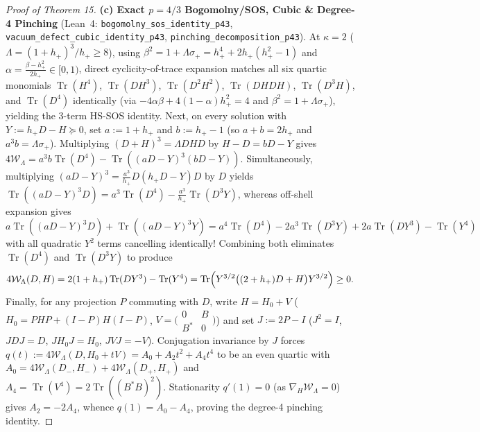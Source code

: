 \documentclass[10pt,letterpaper]{article}
\newcommand{\Tr}{\operatorname{Tr}}
\begin{document}
\begin{proof}[Proof of Theorem 15]
\textbf{(c) Exact $p = 4/3$ Bogomolny/SOS, Cubic \& Degree-4 Pinching} (Lean~4: \texttt{bogomolny\_sos\_identity\_p43}, \texttt{vacuum\_defect\_\allowbreak cubic\_identity\_p43}, \texttt{pinching\_\allowbreak decomposition\_p43}).
At $\kappa = 2$ ($\Lambda = (1+h_+)^3/h_+ \ge 8$), using $\beta^2 = 1 + \Lambda\sigma_+ = h_+^4 + 2h_+(h_+^2 - 1)$ and $\alpha = \frac{\beta - h_+^2}{2h_+} \in [0, 1)$, direct cyclicity-of-trace expansion matches all six quartic monomials $\Tr(H^4)$, $\Tr(D H^3)$, $\Tr(D^2 H^2)$, $\Tr(DHDH)$, $\Tr(D^3 H)$, and $\Tr(D^4)$ identically (via $-4\alpha\beta + 4(1-\alpha)h_+^2 = 4$ and $\beta^2 = 1 + \Lambda\sigma_+$), yielding the 3-term HS-SOS identity. Next, on every solution with $Y := h_+ D - H \succeq 0$, set $a := 1+h_+$ and $b := h_+ - 1$ (so $a + b = 2h_+$ and $a^3 b = \Lambda\sigma_+$). Multiplying $(D+H)^3 = \Lambda D H D$ by $H - D = b D - Y$ gives $4\mathcal{W}_\Lambda = a^3 b\Tr(D^4) - \Tr((aD - Y)^3(bD - Y))$. Simultaneously, multiplying $(aD - Y)^3 = \frac{a^3}{h_+} D(h_+ D - Y) D$ by $D$ yields $\Tr((aD - Y)^3 D) = a^3\Tr(D^4) - \frac{a^3}{h_+}\Tr(D^3 Y)$, whereas off-shell expansion gives $a\Tr((aD-Y)^3 D) + \Tr((aD-Y)^3 Y) = a^4\Tr(D^4) - 2a^3\Tr(D^3 Y) + 2a\Tr(D Y^3) - \Tr(Y^4)$ with all quadratic $Y^2$ terms cancelling identically! Combining both eliminates $\Tr(D^4)$ and $\Tr(D^3 Y)$ to produce
\[
  4\mathcal{W}_\Lambda(D, H) = 2(1+h_+)\Tr(D Y^3) - \Tr(Y^4) = \Tr\Bigl(Y^{3/2}\bigl((2 + h_+)D + H\bigr)Y^{3/2}\Bigr) \ge 0.
\]
Finally, for any projection $P$ commuting with $D$, write $H = H_0 + V$ ($H_0 = PHP + (I-P)H(I-P)$, $V = \bigl(\begin{smallmatrix} 0 & B \\ B^* & 0 \end{smallmatrix}\bigr)$) and set $J := 2P - I$ ($J^2 = I$, $JDJ = D$, $JH_0 J = H_0$, $JVJ = -V$). Conjugation invariance by $J$ forces $q(t) := 4\mathcal{W}_\Lambda(D, H_0 + tV) = A_0 + A_2 t^2 + A_4 t^4$ to be an even quartic with $A_0 = 4\mathcal{W}_\Lambda(D_-, H_-) + 4\mathcal{W}_\Lambda(D_+, H_+)$ and $A_4 = \Tr(V^4) = 2\Tr((B^* B)^2)$. Stationarity $q'(1) = 0$ (as $\nabla_H \mathcal{W}_\Lambda = 0$) gives $A_2 = -2 A_4$, whence $q(1) = A_0 - A_4$, proving the degree-4 pinching identity.


\end{proof}
\end{document}

